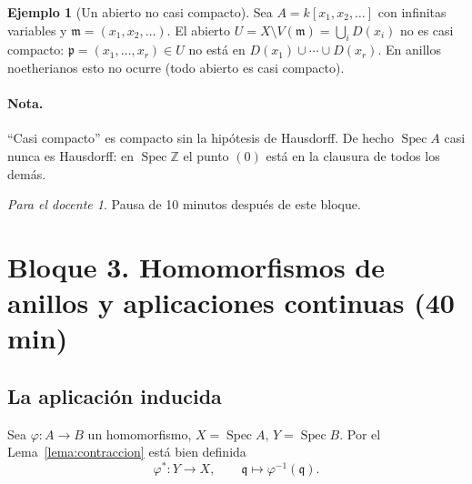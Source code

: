 \documentclass[11pt,a4paper]{article}
\newcommand{\Spec}{\operatorname{Spec}}
\newcommand{\ZZ}{\mathbb{Z}}
\newcommand{\pp}{\mathfrak{p}}
\newcommand{\qq}{\mathfrak{q}}
\newcommand{\mm}{\mathfrak{m}}
\theoremstyle{plain}
\theoremstyle{definition}
\newtheorem{ejemplo}[teorema]{Ejemplo}
\theoremstyle{remark}
\newtheorem*{docente}{Para el docente}
\newcounter{ej}
\begin{document}
\begin{ejemplo}[{Un abierto no casi compacto}]
Sea $A=k[x_1,x_2,\dots]$ con infinitas variables y $\mm=(x_1,x_2,\dots)$. El abierto $U=X\setminus V(\mm)=\bigcup_iD(x_i)$ no es casi compacto: $\pp=(x_1,\dots,x_r)\in U$ no está en $D(x_1)\cup\cdots\cup D(x_r)$. En anillos noetherianos esto no ocurre (todo abierto es casi compacto).
\end{ejemplo}

\paragraph{Nota.} ``Casi compacto'' es compacto sin la hipótesis de Hausdorff. De hecho $\Spec A$ casi nunca es Hausdorff: en $\Spec\ZZ$ el punto $(0)$ está en la clausura de todos los demás.

\begin{docente}
Pausa de 10 minutos después de este bloque.
\end{docente}

\section{Bloque 3. Homomorfismos de anillos y aplicaciones continuas (40 min)}

\subsection{La aplicación inducida}

Sea $\varphi:A\to B$ un homomorfismo, $X=\Spec A$, $Y=\Spec B$. Por el Lema~\ref{lema:contraccion} está bien definida
\[
\varphi^*:Y\to X,\qquad\qq\mapsto\varphi^{-1}(\qq).
\]
\end{document}
